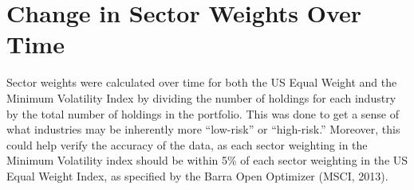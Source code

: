 \documentclass[12pt,twoside]{reedthesis}
\theoremstyle{definition}
\theoremstyle{definition}
\theoremstyle{definition}
\theoremstyle{remark}
\begin{document}
\section{Change in Sector Weights Over
Time}\label{change-in-sector-weights-over-time}

Sector weights were calculated over time for both the US Equal Weight
and the Minimum Volatility Index by dividing the number of holdings for
each industry by the total number of holdings in the portfolio. This was
done to get a sense of what industries may be inherently more
``low-risk'' or ``high-risk.'' Moreover, this could help verify the
accuracy of the data, as each sector weighting in the Minimum Volatility
index should be within 5\% of each sector weighting in the US Equal
Weight Index, as specified by the Barra Open Optimizer (MSCI, 2013).
\end{document}
